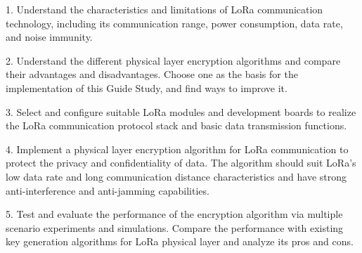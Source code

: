 1. Understand the characteristics and limitations of LoRa communication technology, including its communication range, power consumption, data rate, and noise immunity.



2. Understand the different physical layer encryption algorithms and compare their advantages and disadvantages. Choose one as the basis for the implementation of this Guide Study, and find ways to improve it.

3. Select and configure suitable LoRa modules and development boards to realize the LoRa communication protocol stack and basic data transmission functions.

4. Implement a physical layer encryption algorithm for LoRa communication to protect the privacy and confidentiality of data. The algorithm should suit LoRa's low data rate and long communication distance characteristics and have strong anti-interference and anti-jamming capabilities.

5. Test and evaluate the performance of the encryption algorithm via multiple scenario experiments and simulations. Compare the performance with existing key generation algorithms for LoRa physical layer and analyze its pros and cons.

